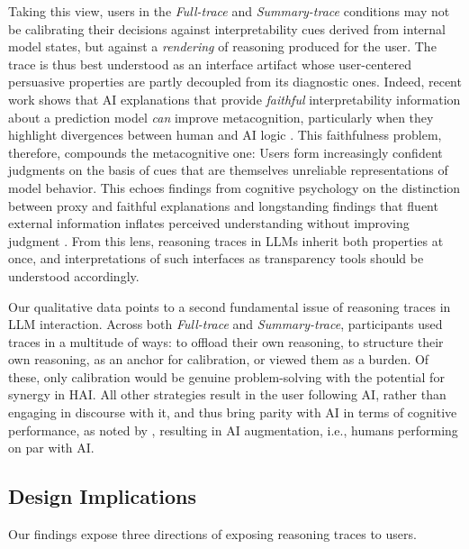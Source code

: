 \documentclass[manuscript,review,anonymous]{acmart}
\let\xtodo\todo
\renewcommand{\todo}[1]{\xtodo[inline,color=green!50]{#1}}
\newcommand{\todoredundant}[1]{\xtodo[inline,color=red!35]{\textbf{REDUNDANT:} #1}}
\begin{document}
Taking this view, users in the \textit{Full-trace} and \textit{Summary-trace} conditions may not be calibrating their decisions against interpretability cues derived from internal model states, but against a \textit{rendering} of reasoning produced for the user. The trace is thus best understood as an interface artifact whose user-centered persuasive properties are partly decoupled from its diagnostic ones. Indeed, recent work shows that AI explanations that provide \textit{faithful} interpretability information about a prediction model \textit{can} improve metacognition, particularly when they highlight divergences between human and AI logic \cite{von2025knowing}. This faithfulness problem, therefore, compounds the metacognitive one: Users form increasingly confident judgments on the basis of cues that are themselves unreliable representations of model behavior. This echoes findings from cognitive psychology on the distinction between proxy and faithful explanations \cite{rozenblit2002misunderstood} and longstanding findings that fluent external information inflates perceived understanding without improving judgment \cite{alter2009uniting}. From this lens, reasoning traces in LLMs inherit both properties at once, and interpretations of such interfaces as transparency tools should be understood accordingly.%



Our qualitative data points to a second fundamental issue of reasoning traces in LLM interaction. Across both \textit{Full-trace} and \textit{Summary-trace}, participants used traces in a multitude of ways: to offload their own reasoning, to structure their own reasoning, as an anchor for calibration, or viewed them as a burden. Of these, only calibration would be genuine problem-solving with the potential for synergy in HAI. All other strategies result in the user following AI, rather than engaging in discourse with it, and thus bring parity with AI in terms of cognitive performance, as noted by \citet{vaccaro2024combinations}, resulting in AI augmentation, i.e., humans performing on par with AI. 


\subsection{Design Implications}
Our findings expose three directions of exposing reasoning traces to users. 
\end{document}
